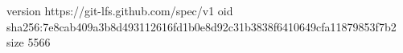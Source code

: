 version https://git-lfs.github.com/spec/v1
oid sha256:7e8cab409a3b8d493112616fd1b0e8d92c31b3838f6410649cfa11879853f7b2
size 5566
